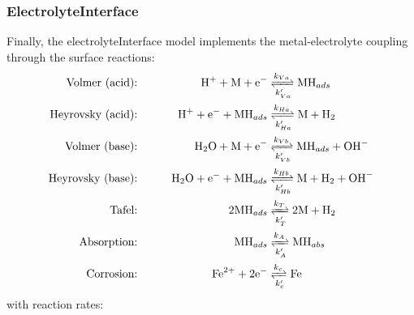 \documentclass[3p]{elsarticle} %
\begin{document}
\subsubsection{ElectrolyteInterface}
Finally, the electrolyteInterface model implements the metal-electrolyte coupling through the surface reactions:
\begin{alignat}{2}
 \text{Volmer (acid):} && \mathrm{H}^+ + \mathrm{M} + \mathrm{e}^- &\xrightleftharpoons[k_{Va}']{k_{Va}} \mathrm{MH}_{ads} \label{react:1} \\
  \text{Heyrovsky (acid):} && \qquad \mathrm{H}^+ + \mathrm{e}^- + \mathrm{MH}_{ads}&\xrightleftharpoons[k_{Ha}']{k_{Ha}} \mathrm{M} + \mathrm{H}_2 \label{react:2} \\
    \text{Volmer (base):} &&  \mathrm{H}_2\mathrm{O} + \mathrm{M} + \mathrm{e}^- &\xrightleftharpoons[k_{Vb}']{k_{Vb}} \mathrm{MH}_{ads} + \mathrm{OH}^- \label{react:5} \\
   \text{Heyrovsky (base):} && \qquad  \mathrm{H}_2\mathrm{O} + \mathrm{e}^- + \mathrm{MH}_{ads}&\xrightleftharpoons[k_{Hb}']{k_{Hb}} \mathrm{M} + \mathrm{H}_2 + \mathrm{OH}^- \label{react:6} \\
    \text{Tafel:} && 2 \mathrm{MH}_{ads} &\xrightleftharpoons[k_T']{k_T} 2\mathrm{M} + \mathrm{H}_2 \label{react:3} \\
   \text{Absorption:} && \mathrm{MH}_{ads} &\xrightleftharpoons[k_A']{k_A} \mathrm{MH}_{abs}  \label{react:4} \\
   \text{Corrosion:} && \qquad  \mathrm{Fe}^{2+}+2\mathrm{e}^- &\xrightleftharpoons[k_c']{k_c} \mathrm{Fe} \label{react:7}
\end{alignat}
with reaction rates:
\end{document}
